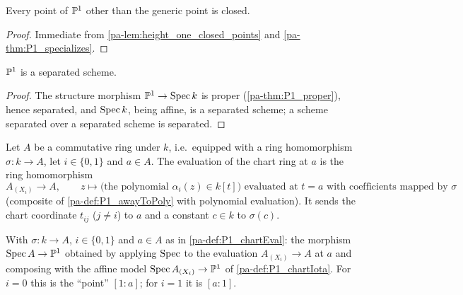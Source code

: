 \begin{lemma}
  \label{pa-lem:P1_closed_points}
  \leanok

  Every point of \(\mathbb{P}^1\) other than the generic point is closed.
\end{lemma}
\begin{proof}
  \leanok
  Immediate from \ref{pa-lem:height_one_closed_points} and \ref{pa-thm:P1_specializes}.
\end{proof}

\begin{theorem}
  \label{pa-thm:P1_separated}
  \leanok

  \(\mathbb{P}^1\) is a separated scheme.
\end{theorem}
\begin{proof}
  \leanok
  The structure morphism \(\mathbb{P}^1 \to \operatorname{Spec} k\) is proper (\ref{pa-thm:P1_proper}), hence
  separated, and \(\operatorname{Spec} k\), being affine, is a separated scheme; a scheme separated over
  a separated scheme is separated.
\end{proof}

\begin{definition}
  \label{pa-def:P1_chartEval}
  \leanok

  Let \(A\) be a commutative ring under \(k\), i.e.\ equipped with a ring homomorphism
  \(\sigma : k \to A\), let \(i \in \{0,1\}\) and \(a \in A\). The evaluation of the chart
  ring at \(a\) is the ring homomorphism
  \[
    A_{(X_i)} \longrightarrow A, \qquad
    z \longmapsto \bigl(\text{the polynomial } \alpha_i(z) \in k[t]\bigr)
      \text{ evaluated at } t = a \text{ with coefficients mapped by } \sigma
  \]
  (composite of \ref{pa-def:P1_awayToPoly} with polynomial evaluation). It sends the chart
  coordinate \(t_{ij}\) (\(j \neq i\)) to \(a\) and a constant \(c \in k\) to \(\sigma(c)\).
\end{definition}

\begin{definition}
  \label{pa-def:P1_fromSpecChart}
  \leanok

  With \(\sigma : k \to A\), \(i \in \{0,1\}\) and \(a \in A\) as in
  \ref{pa-def:P1_chartEval}: the morphism \(\operatorname{Spec} A \to \mathbb{P}^1\) obtained by applying
  \(\operatorname{Spec}\) to the evaluation \(A_{(X_i)} \to A\) at \(a\) and composing with the affine
  model \(\operatorname{Spec} A_{(X_i)} \to \mathbb{P}^1\) of \ref{pa-def:P1_chartIota}. For \(i = 0\) this is the
  ``point'' \([1 : a]\); for \(i = 1\) it is \([a : 1]\).
\end{definition}

